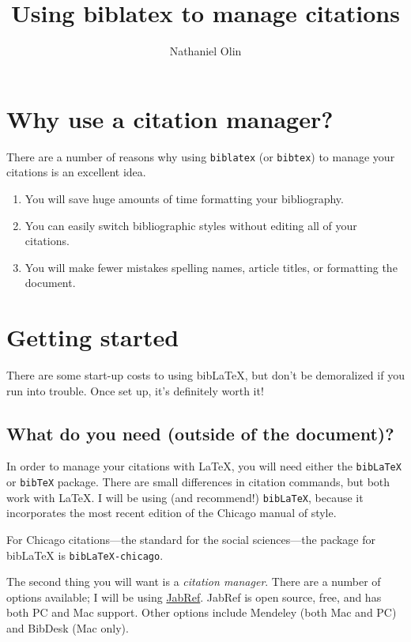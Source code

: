 \documentclass[12pt]{article}
\title{Using biblatex to manage citations}
\author{Nathaniel Olin}
\begin{document}
\maketitle
\pagestyle{fancy}

\section{Why use a citation manager?}

There are a number of reasons why using \verb+biblatex+ (or \verb+bibtex+) to manage your citations is an excellent idea.
\begin{enumerate}
	\item You will save huge amounts of time formatting your bibliography.
	\item You can easily switch bibliographic styles without editing all of your citations.
	\item You will make fewer mistakes spelling names, article titles, or formatting the document.
\end{enumerate}

\section{Getting started}

There are some start-up costs to using bibLaTeX, but don't be demoralized if you run into trouble. Once set up, it's definitely worth it!

\subsection{What do you need (outside of the document)?}

In order to manage your citations with \LaTeX, you will need either the \verb+bibLaTeX+ or \verb+bibTeX+ package. There are small differences in citation commands, but both work with \LaTeX. I will be using (and recommend!) \verb+bibLaTeX+, because it incorporates the most recent edition of the Chicago manual of style.

For Chicago citations---the standard for the social sciences---the package for bibLaTeX is \verb+bibLaTeX-chicago+.

The second thing you will want is a {\em citation manager}. There are a number of options available; I will be using \href{http://jabref.sourceforge.net}{JabRef}. JabRef is open source, free, and has both PC and Mac support. Other options include Mendeley (both Mac and PC) and BibDesk (Mac only). 
\end{document}
